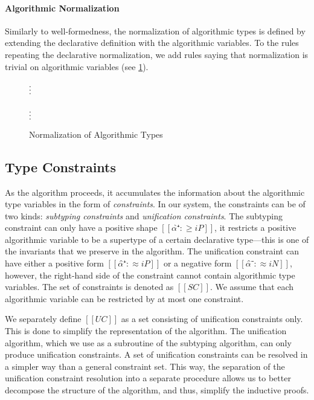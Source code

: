 \paragraph{Algorithmic Normalization}
Similarly to well-formedness, the normalization of algorithmic types is defined
by extending the declarative definition with the algorithmic variables.
To the rules repeating the declarative normalization, we add
rules saying that normalization is trivial on algorithmic variables (see \cref{fig:algo-nf}).

\begin{figure}[h]
\begin{multicols}{2}
  $\vcenter{\hbox{\vdots}}$\\
  \ottusedrule{\ottdruleNrmPUVar{}}
  \columnbreak\\
  $\vcenter{\hbox{\vdots}}$\\
  \ottusedrule{\ottdruleNrmNUVar{}}
\end{multicols}
\label{fig:algo-nf}
\caption{Normalization of Algorithmic Types}
\end{figure}

\subsection{Type Constraints}
As the algorithm proceeds, it accumulates the information 
about the algorithmic type variables in the form of \emph{constraints}.
In our system, the constraints can be of two kinds: 
\emph{subtyping constraints} and \emph{unification constraints}.
The subtyping constraint can only have a positive shape $[[α̂⁺ :≥ iP]]$, \ie it 
restricts a positive algorithmic variable to be a 
supertype of a certain declarative type---this is one of the invariants that we 
preserve in the algorithm.
The unification constraint can have either a positive form $[[α̂⁺ :≈ iP]]$ or
a negative form $[[α̂⁻ :≈ iN]]$, however, the right-hand side of the constraint
cannot contain algorithmic type variables.
The set of constraints is denoted as $[[SC]]$. 
We assume that each algorithmic variable can be restricted by at most one constraint.

We separately define $[[UC]]$ as a set consisting of unification constraints only.
This is done to simplify the representation of the algorithm. 
The unification algorithm, which we use as a subroutine of the subtyping algorithm,
can only produce unification constraints.
A set of unification constraints can be resolved in a simpler way than
a general constraint set. This way, 
the separation of the unification constraint resolution into a separate
procedure allows us to better decompose the structure of the algorithm,
and thus, simplify the inductive proofs.


